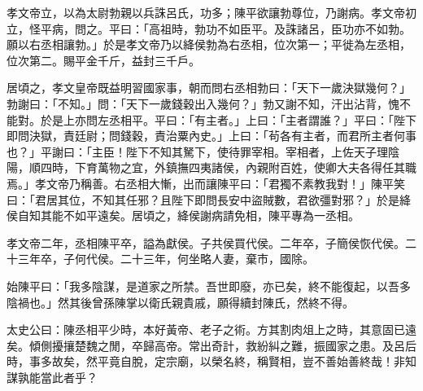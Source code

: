 \begin{pinyinscope}
孝文帝立，以為太尉勃親以兵誅呂氏，功多；陳平欲讓勃尊位，乃謝病。孝文帝初立，怪平病，問之。平曰：「高祖時，勃功不如臣平。及誅諸呂，臣功亦不如勃。願以右丞相讓勃。」於是孝文帝乃以絳侯勃為右丞相，位次第一；平徙為左丞相，位次第二。賜平金千斤，益封三千戶。

居頃之，孝文皇帝既益明習國家事，朝而問右丞相勃曰：「天下一歲決獄幾何？」勃謝曰：「不知。」問：「天下一歲錢穀出入幾何？」勃又謝不知，汗出沾背，愧不能對。於是上亦問左丞相平。平曰：「有主者。」上曰：「主者謂誰？」平曰：「陛下即問決獄，責廷尉；問錢穀，責治粟內史。」上曰：「茍各有主者，而君所主者何事也？」平謝曰：「主臣！陛下不知其駑下，使待罪宰相。宰相者，上佐天子理陰陽，順四時，下育萬物之宜，外鎮撫四夷諸侯，內親附百姓，使卿大夫各得任其職焉。」孝文帝乃稱善。右丞相大慚，出而讓陳平曰：「君獨不素教我對！」陳平笑曰：「君居其位，不知其任邪？且陛下即問長安中盜賊數，君欲彊對邪？」於是絳侯自知其能不如平遠矣。居頃之，絳侯謝病請免相，陳平專為一丞相。

孝文帝二年，丞相陳平卒，謚為獻侯。子共侯買代侯。二年卒，子簡侯恢代侯。二十三年卒，子何代侯。二十三年，何坐略人妻，棄市，國除。

始陳平曰：「我多陰謀，是道家之所禁。吾世即廢，亦已矣，終不能復起，以吾多陰禍也。」然其後曾孫陳掌以衛氏親貴戚，願得續封陳氏，然終不得。

太史公曰：陳丞相平少時，本好黃帝、老子之術。方其割肉俎上之時，其意固已遠矣。傾側擾攘楚魏之閒，卒歸高帝。常出奇計，救紛糾之難，振國家之患。及呂后時，事多故矣，然平竟自脫，定宗廟，以榮名終，稱賢相，豈不善始善終哉！非知謀孰能當此者乎？


\end{pinyinscope}